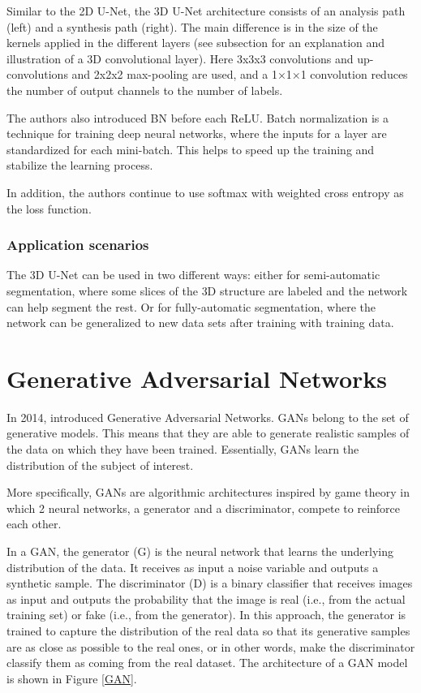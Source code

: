Similar to the \ac{2D} U-Net, the \ac{3D} U-Net architecture consists of an analysis path (left) and a synthesis path (right). The main difference is in the size of the kernels applied in the different layers (see subsection  for an explanation and illustration of a \ac{3D} convolutional layer). Here 3x3x3 convolutions and up-convolutions and 2x2x2 max-pooling are used, and a 1×1×1 convolution reduces the number of output channels to the number of labels. 

The authors also introduced \ac{BN} before each \ac{ReLU}. Batch normalization is a technique for training deep neural networks, where the inputs for a layer are standardized for each mini-batch. This helps to speed up the training and stabilize the learning process.

In addition, the authors continue to use softmax with weighted cross entropy as the loss function.

\subsubsection*{Application scenarios}

The \ac{3D} U-Net can be used in two different ways: either for semi-automatic segmentation, where some slices of the \ac{3D} structure are labeled and the network can help segment the rest. Or for fully-automatic segmentation, where the network can be generalized to new data sets after training with training data.

\section{Generative Adversarial Networks}
\label{section:GANs}
In 2014, \citet{GAN_original} introduced Generative Adversarial Networks. \ac{GANs} belong to the set of generative models. This means that they are able to generate realistic samples of the data on which they have been trained. Essentially, \ac{GANs} learn the distribution of the subject of interest.

More specifically, \ac{GANs} are algorithmic architectures inspired by game theory in which 2 neural networks, a generator and a discriminator, compete to reinforce each other. 

In a \ac{GAN}, the generator (G) is the neural network that learns the underlying distribution of the data. It receives as input a noise variable and outputs a synthetic sample. The discriminator (D) is a binary classifier that receives images as input and outputs the probability that the image is real (i.e., from the actual training set) or fake (i.e., from the generator). In this approach, the generator is trained to capture the distribution of the real data so that its generative samples are as close as possible to the real ones, or in other words, make the discriminator classify them as coming from the real dataset. The architecture of a \ac{GAN} model is shown in Figure \ref{GAN}. 

